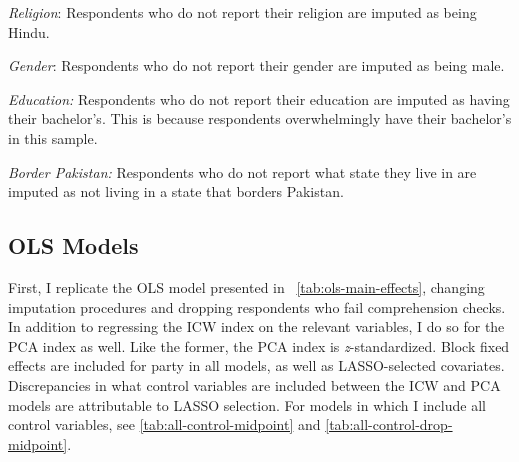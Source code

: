 \documentclass[12pt]{article}
\begin{document}
\textit{Religion}: Respondents who do not report their religion are imputed as being Hindu.

\textit{Gender}: Respondents who do not report their gender are imputed as being male.

\textit{Education:} Respondents who do not report their education are imputed as having their bachelor's. This is because respondents overwhelmingly have their bachelor's in this sample.

\textit{Border Pakistan:} Respondents who do not report what state they live in are imputed as not living in a state that borders Pakistan.

\subsection*{OLS Models}

First, I replicate the OLS model presented in ~\autoref{tab:ols-main-effects}, changing imputation procedures and dropping respondents who fail comprehension checks. In addition to regressing the ICW index on the relevant variables, I do so for the PCA index as well. Like the former, the PCA index is \textit{z}-standardized. Block fixed effects are included for party in all models, as well as LASSO-selected covariates. Discrepancies in what control variables are included between the ICW and PCA models are attributable to LASSO selection. For models in which I include all control variables, see \autoref{tab:all-control-midpoint}  and \autoref{tab:all-control-drop-midpoint}.\\
\end{document}
